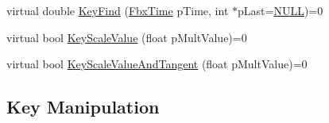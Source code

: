 \begin{DoxyCompactItemize}
\item 
virtual double \hyperlink{class_fbx_anim_curve_a19b276335ead40663ccf4c16d6ff5e27}{Key\+Find} (\hyperlink{class_fbx_time}{Fbx\+Time} p\+Time, int $\ast$p\+Last=\hyperlink{fbxarch_8h_a070d2ce7b6bb7e5c05602aa8c308d0c4}{N\+U\+LL})=0
\item 
virtual bool \hyperlink{class_fbx_anim_curve_a5422351a86bda5b21e6ed5ce6658477e}{Key\+Scale\+Value} (float p\+Mult\+Value)=0
\item 
virtual bool \hyperlink{class_fbx_anim_curve_a2f09fd7ebeb68f8aa34f53926daf538b}{Key\+Scale\+Value\+And\+Tangent} (float p\+Mult\+Value)=0
\end{DoxyCompactItemize}
\subsection*{Key Manipulation}
